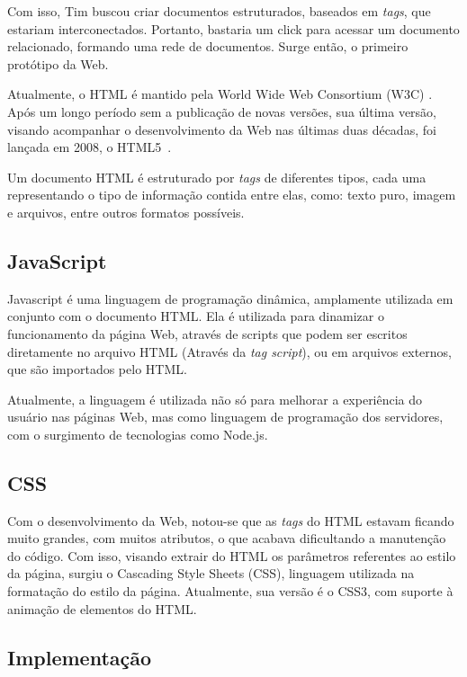 Com isso, Tim buscou criar documentos estruturados, baseados em \textit{
tags}, que estariam interconectados. Portanto, bastaria um click para acessar um documento relacionado, formando uma rede de documentos. Surge então, o primeiro protótipo da Web.

Atualmente, o HTML é mantido pela World Wide Web Consortium (W3C) . Após um longo período sem a publicação de novas versões, sua última versão, visando acompanhar o desenvolvimento da Web nas últimas duas décadas, foi lançada em 2008, o HTML5~\cite{htmlw3cs}.  

Um documento HTML é estruturado por \textit{tags} de diferentes tipos, cada uma representando o tipo de informação contida entre elas, como: texto puro, imagem e arquivos, entre outros formatos possíveis.


\subsection{JavaScript}

Javascript é uma linguagem de programação dinâmica, amplamente utilizada em conjunto com o documento HTML. Ela é utilizada para dinamizar o funcionamento da página Web, através de scripts que podem ser escritos diretamente no arquivo HTML (Através da \textit{tag script}), ou em arquivos externos, que são importados pelo HTML.

Atualmente, a linguagem é utilizada não só para melhorar a experiência do usuário nas páginas Web, mas como linguagem de programação dos servidores, com o surgimento de tecnologias como Node.js.

\subsection{CSS}

Com o desenvolvimento da Web, notou-se que as \textit{tags} do HTML estavam ficando muito grandes, com muitos atributos, o que acabava dificultando a manutenção do código. Com isso, visando extrair do HTML os parâmetros referentes ao estilo da página, surgiu o Cascading Style Sheets (CSS), linguagem utilizada na formatação do estilo da página. Atualmente, sua versão é o CSS3, com suporte à animação de elementos do HTML.

\subsection{Implementação}


